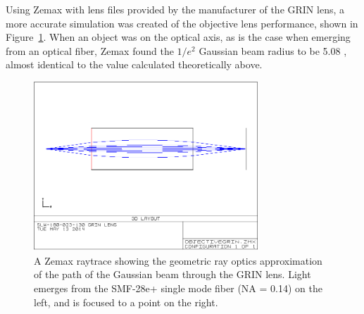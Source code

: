 Using Zemax with lens files provided by the manufacturer of the GRIN lens, a more accurate simulation was created of the objective lens performance, shown in Figure~\ref{grin_raytrace}. When an object was on the optical axis, as is the case when emerging from an optical fiber, Zemax found the $1/e^2$ Gaussian beam radius to be 5.08 \micron, almost identical to the value calculated theoretically above.

\begin{figure}[h!]
\centering
\includegraphics[width=0.75\textwidth]{Images/Zemax/GRO-raytrace2.png}
\caption[A Zemax raytrace showing the path of light through the GRIN lens.]{A Zemax raytrace showing the geometric ray optics approximation of the path of the Gaussian beam through the GRIN lens. Light emerges from the SMF-28e+ single mode fiber (NA = 0.14) on the left, and is focused to a point on the right.\label{grin_raytrace}}
\end{figure}



